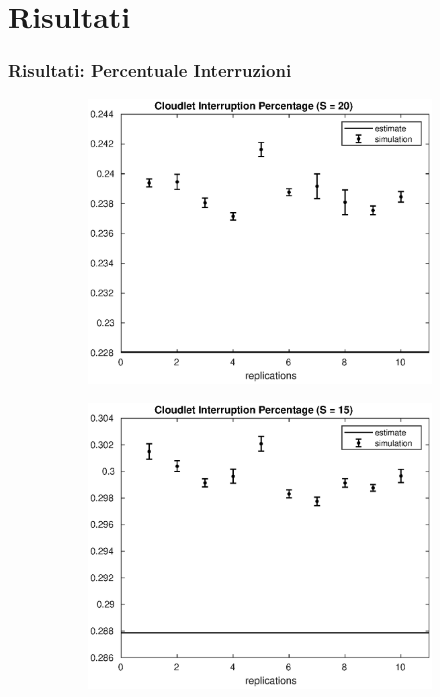 \section{Risultati}
\newcommand{\epsmx}{$\varepsilon_{max}$}
\begin{frame}
\frametitle{Risultati: Percentuale Interruzioni}

\begin{figure}[!h]
\centering
%
\begin{subfigure}[t]{0.49\textwidth}
\includegraphics[width=\textwidth]{../figures/simul/20_500K_intperc}
\label{20_intperc}
\end{subfigure}
%
\begin{subfigure}[t]{0.49\textwidth}
\includegraphics[width=\textwidth]{../figures/simul/15_500K_intperc}

\end{subfigure}
\end{figure}
\end{frame}
